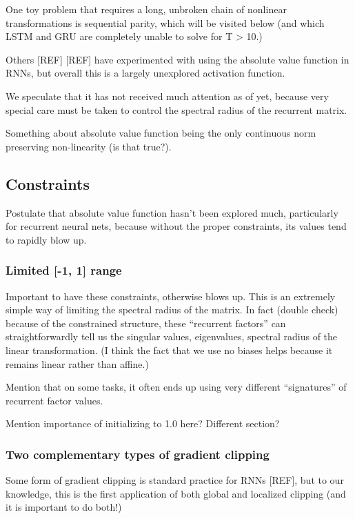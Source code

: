 \documentclass{article}
\begin{document}
One toy problem that requires a long, unbroken chain of nonlinear transformations is sequential parity, which will be visited below (and which LSTM and GRU are completely unable to solve for T > 10.)

Others [REF] [REF] have experimented with using the absolute value function in RNNs, but overall this is a largely unexplored activation function.
 
We speculate that it has not received much attention as of yet, because very special care must be taken to control the spectral radius of the recurrent matrix.

Something about absolute value function being the only continuous norm preserving non-linearity (is that true?).

\subsection{Constraints}

Postulate that absolute value function hasn’t been explored much, particularly for recurrent neural nets, because without the proper constraints, its values tend to rapidly blow up.

\subsubsection{Limited [-1, 1] range}
Important to have these constraints, otherwise blows up.
This is an extremely simple way of limiting the spectral radius of the matrix.
In fact (double check) because of the constrained structure, these “recurrent factors” can straightforwardly tell us the singular values, eigenvalues, spectral radius of the linear transformation. (I think the fact that we use no biases helps because it remains linear rather than affine.)

Mention that on some tasks, it often ends up using very different “signatures” of recurrent factor values.

Mention importance of initializing to 1.0 here? Different section?
\subsubsection{Two complementary types of gradient clipping}

Some form of gradient clipping is standard practice for RNNs [REF], but to our knowledge, this is the first application of both global and localized clipping (and it is important to do both!)
\end{document}
